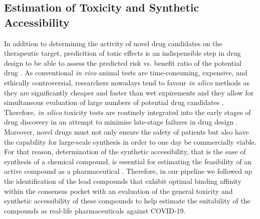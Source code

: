 \documentclass[11pt, letterpaper, titlepage]{article}
\begin{document}
\subsection{Estimation of Toxicity and Synthetic Accessibility}
In addition to determining the activity of novel drug candidates on the therapeutic target, predicition of toxic effects is an indispensible step in drug design to be able to assess the predicted risk vs. benefit ratio of the potential drug \cite{roncaglioni2013silico}. As conventional \textit{in vivo} animal tests are time-consuming, expensive, and ethically controversial, researchers nowadays tend to favour \textit{in silico} methods as they are significantly cheaper and faster than wet expirements and they allow for simultaneous evaluation of large numbers of potential drug candidates \cite{raies2016silico,roncaglioni2013silico}. Therefore, \textit{in silico} toxicity tests are routinely integrated into the early stages of drug discovery in an attempt to minimise late-stage failures in drug design \cite{dearden2003silico}. Moreover, novel drugs must not only ensure the safety of patients but also have the capability for large-scale synthesis in order to one day be commercially viable. For that reason, determination of the synthetic accessibility, that is the ease of synthesis of a chemical compound, is essential for estimating the feasibility of an active compound as a pharmaceutical \cite{boda2007structure}. Therefore, in our pipeline we followed up the identification of the lead compounds that exhibit optimal binding affinity within the consensus pocket with an evaluation of the general toxicity and synthetic accessibility of these compounds to help estimate the suitability of the compounds as real-life pharmaceuticals against \ac{COVID-19}.
\end{document}
